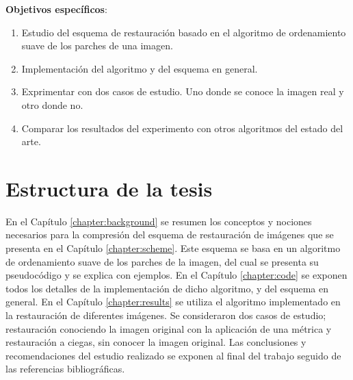 \begin{introduction}
\qquad

\textbf{Objetivos espec\'ificos}: \begin{enumerate}
	\item Estudio del esquema de restauraci\'on basado en el algoritmo de ordenamiento suave de los parches de una imagen.
	\item Implementaci\'on del algoritmo y del esquema en general.
	\item Exprimentar con dos casos de estudio. Uno donde se conoce la imagen real y otro donde no.
	\item Comparar los resultados del experimento con otros algoritmos del estado del arte.
\end{enumerate}

\section*{Estructura de la tesis}

En el Cap\'itulo \ref{chapter:background} se resumen los conceptos y nociones necesarios para la compresi\'on del esquema de restauraci\'on de im\'agenes que se presenta en el Cap\'itulo \ref{chapter:scheme}. Este esquema se basa en un algoritmo de ordenamiento suave de los parches de la imagen, del cual se presenta su pseudoc\'odigo y se explica con ejemplos. En el Cap\'itulo \ref{chapter:code} se exponen todos los detalles de la implementaci\'on de dicho algoritmo, y del esquema en general. En el Cap\'itulo \ref{chapter:results} se utiliza el algoritmo implementado en la restauración de diferentes imágenes. Se consideraron dos casos de estudio; restauración conociendo la imagen original con la aplicación de una métrica y restauración a ciegas, sin conocer la imagen original. Las conclusiones y recomendaciones del estudio realizado se exponen al final del trabajo seguido de las referencias bibliográficas.

\end{introduction}
